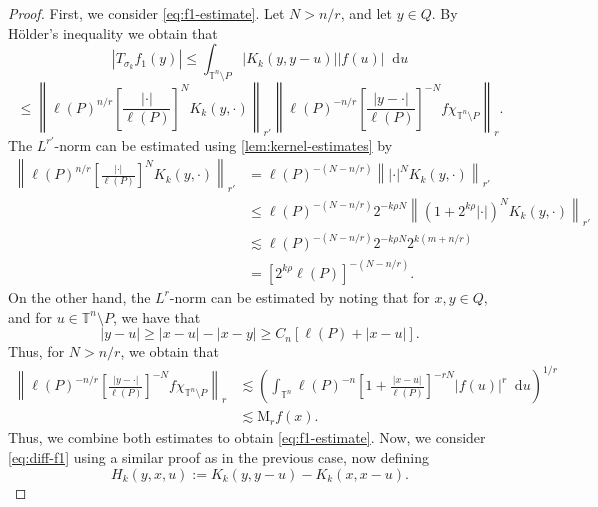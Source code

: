 \documentclass[10pt,a4paper]{amsart}
\newcommand*\diff{\mathop{}\!\mathrm{d}}
\begin{document}
\begin{proof}
    First, we consider \cref{eq:f1-estimate}. Let $N>n/r$, and let $y\in Q$. By H\"older's inequality we obtain that
    \begin{equation*}
        |T_{\sigma_k}f_1(y)| \leq \int_{\mathbb{T}^n\setminus P} |K_k(y, y-u)||f(u)|\diff u 
    \end{equation*}
    \begin{equation*}
        \leq \left\| \ell(P)^{n/r} \left[ \frac{|\cdot|}{\ell(P)} \right]^N K_k(y, \cdot) 
        \right\|_{r'} \left\| \ell(P)^{-n/r} \left[ \frac{|y-\cdot|}{\ell(P)} \right]^{-N} f\chi_{\mathbb{T}^n\setminus P} 
        \right\|_r.
    \end{equation*}
    The $L^{r'}$-norm can be estimated using \cref{lem:kernel-estimates} by 
    \begin{align*}
        \left\| \ell(P)^{n/r} \left[ \frac{|\cdot|}{\ell(P)} \right]^N K_k(y, \cdot) 
        \right\|_{r'} & = \ell(P)^{-(N-n/r)} \left\| |\cdot|^N K_k(y, \cdot)  \right\|_{r'} \\
        & \leq \ell(P)^{-(N-n/r)} 2^{-k\rho N} \left\| (1+2^{k\rho} |\cdot|)^N K_k(y, \cdot)  \right\|_{r'} \\
        & \lesssim \ell(P)^{-(N-n/r)} 2^{-k\rho N} 2^{k(m+n/r)}\\
        & = [2^{k\rho}\ell(P)]^{-(N-n/r)}.
    \end{align*}
    On the other hand, the $L^r$-norm can be estimated by noting that for $x, y \in Q$, and for $u \in \mathbb{T}^n\setminus P$, we have that
    \begin{equation*}
        |y-u|\geq |x-u|-|x-y| \geq C_n[\ell(P)+|x-u|].
    \end{equation*}
    Thus, for $N>n/r$, we obtain that
    \begin{align*}
        \left\| \ell(P)^{-n/r} \left[ \frac{|y-\cdot|}{\ell(P)} \right]^{-N}f \chi_{\mathbb{T}^n\setminus P}
        \right\|_r& \lesssim\left( \int_{\mathbb{T}^n} \ell(P)^{-n} \left[ 1+\frac{|x-u|}{\ell(P)}
        \right]^{-rN} |f(u)|^r \diff u
        \right)^{1/r} \\
        & \lesssim\mathrm{M}_rf(x).
    \end{align*}
    Thus, we combine both estimates to obtain \cref{eq:f1-estimate}. Now, we consider \cref{eq:diff-f1} using a similar proof as in the previous case, now defining 
    \begin{equation*}
        H_k(y, x, u) := K_k(y, y-u) - K_k(x, x-u).
    \end{equation*}

\end{proof}
\end{document}
